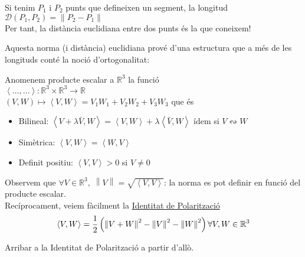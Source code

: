\documentclass[a4paper,12pt]{article}
\begin{document}
\begin{demostracio}
\begin{center}
		\end{center}
		Si tenim $P_1\text{ i }P_2$ punts que defineixen un segment, la longitud $\mathcal{D}\left(P_1, P_2\right) = \left\lVert P_2-P_1\right\rVert$\\
		Per tant, la distància euclidiana entre dos punts és la que coneixem!
	\end{demostracio}
	Aquesta norma (i distància) euclidiana prové d'una estructura que a més de les longituds conté la
	noció d'ortogonalitat:
	\begin{definicio}
	    Anomenem producte escalar a $\mathbb{R}^3$ la funció\\
	    $\left\langle\dots, \dots\right\rangle: \mathbb{R}^3 \times \mathbb{R}^3 \to \mathbb{R}$\\
	    $\left(V, W\right) \mapsto \left\langle V, W\right\rangle = V_1W_1 + V_2W_2 + V_3W_3$
	    que és
	    \begin{itemize}
	        \item Bilineal: $\left\langle V+\lambda \bar{V}, W\right\rangle = \left\langle V, W\right\rangle + \lambda\left\langle \bar{V}, W\right\rangle$ ídem si $V \leftrightsquigarrow W$
	        \item Simètrica: $\left\langle V, W\right\rangle = \left\langle W, V\right\rangle$
	        \item Definit positiu: $\left\langle V, V\right\rangle > 0$ si $V \neq 0$
	    \end{itemize}
	\end{definicio}
	Observem que $\forall V \in \mathbb{R}^3,\;\left\lVert V\right\rVert = \sqrt{\left\langle V, V\right\rangle}$:
	la norma es pot definir en funció del producte escalar.\\
	Recíprocament, veiem fàcilment la \underline{Identitat de Polarització}
	\begin{displaymath}
	    \left\langle V, W\right\rangle = \frac{1}{2}\left(\left\lVert V+W\right\rVert^2 - \left\lVert V\right\rVert^2 - \left\lVert W\right\rVert^2\right)\\
	    \forall V, W \in \mathbb{R}^3
	\end{displaymath}
	\begin{exercici}
	    Arribar a la Identitat de Polarització a partir d'allò.
	\end{exercici}
\end{document}
